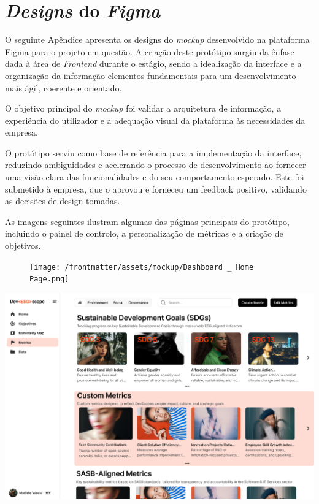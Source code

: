 \chapter{\textit{Designs} do \textit{Figma}}
\label{AppendixC}

O seguinte Apêndice apresenta os designs do \textit{mockup}  desenvolvido na plataforma Figma para o projeto em questão. A criação deste protótipo surgiu da ênfase dada à área de \textit{Frontend} durante o estágio, sendo a idealização da interface e a organização da informação elementos fundamentais para um desenvolvimento mais ágil, coerente e orientado.

O objetivo principal do \textit{mockup} foi validar a arquitetura de informação, a experiência do utilizador e a adequação visual da plataforma às necessidades da empresa.

O protótipo serviu como base de referência para a implementação da interface, reduzindo ambiguidades e acelerando o processo de desenvolvimento ao fornecer uma visão clara das funcionalidades e do seu comportamento esperado. Este foi submetido à empresa, que o aprovou e forneceu um feedback positivo, validando as decisões de design tomadas.

As imagens seguintes ilustram algumas das páginas principais do protótipo, incluindo o painel de controlo, a personalização de métricas e a criação de objetivos.

\begin{figure}[H]
\centering
\texttt{[image: /frontmatter/assets/mockup/Dashboard \_ Home Page.png]}
    \label{fig:dashboardESG}
\end{figure}


\begin{landscape}
\centering
\includegraphics[width=0.9\linewidth]{frontmatter/assets/mockup/Metrics_and_ODS_Customization.png}
\label{fig:metricPage}
\end{landscape}


